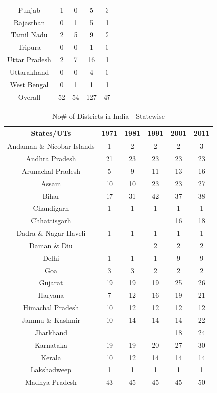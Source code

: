 \documentclass[12pt, a4paper]{article}
\begin{document}
\begin{table}[h!]
\begin{tabular}{c|cccc}
		Punjab & 1 & 0 & 5 & 3  \\ 
		Rajasthan & 0 & 1 & 5 & 1  \\ 
		Tamil Nadu & 2 & 5 & 9 & 2  \\ 
		Tripura & 0 & 0 & 1 & 0  \\ 
		Uttar Pradesh & 2 & 7 & 16 & 1  \\ 
		Uttarakhand & 0 & 0 & 4 & 0  \\ 
		West Bengal & 0 & 1 & 1 & 1  \\ 
		\hline
		Overall & 52 & 54 & 127 & 47  \\ 
		\hline
	\end{tabular}
\end{table}

\begin{table}[h!]
	\centering
	\caption{No\# of Districts in India - Statewise}
	\label{Fig2}
	\begin{tabular}{c|ccccc} 
		\hline
		States/UTs & 1971 & 1981 & 1991 & 2001 & 2011 \\
		\hline 
		Andaman \& Nicobar Islands & 1 & 2 & 2 & 2 & 3 \\ 
		Andhra Pradesh & 21 & 23 & 23 & 23 & 23 \\ 
		Arunachal Pradesh & 5 & 9 & 11 & 13 & 16 \\ 
		Assam & 10 & 10 & 23 & 23 & 27 \\ 
		Bihar & 17 & 31 & 42 & 37 & 38 \\ 
		Chandigarh & 1 & 1 & 1 & 1 & 1 \\ 
		Chhattisgarh &  &  &  & 16 & 18 \\ 
		Dadra \& Nagar Haveli & 1 & 1 & 1 & 1 & 1 \\ 
		Daman \& Diu &  &  & 2 & 2 & 2 \\ 
		Delhi & 1 & 1 & 1 & 9 & 9 \\ 
		Goa & 3 & 3 & 2 & 2 & 2 \\ 
		Gujarat & 19 & 19 & 19 & 25 & 26 \\ 
		Haryana & 7 & 12 & 16 & 19 & 21 \\ 
		Himachal Pradesh & 10 & 12 & 12 & 12 & 12 \\ 
		Jammu \& Kashmir & 10 & 14 & 14 & 14 & 22 \\ 
		Jharkhand &  &  &  & 18 & 24 \\ 
		Karnataka & 19 & 19 & 20 & 27 & 30 \\ 
		Kerala & 10 & 12 & 14 & 14 & 14 \\ 
		Lakshadweep & 1 & 1 & 1 & 1 & 1 \\ 
		Madhya Pradesh & 43 & 45 & 45 & 45 & 50 \\ 

\end{tabular}
\end{table}
\end{document}
